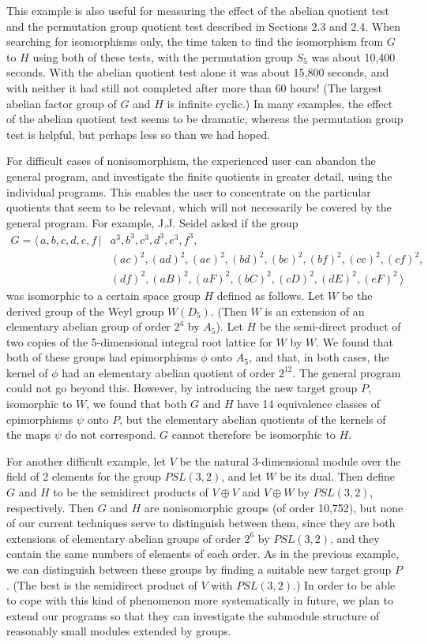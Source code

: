 This example is also useful for measuring the effect of the abelian quotient
test and the 
permutation group quotient test described in Sections 2.3 and 2.4.
When searching for isomorphisms only, the time taken to
find the isomorphism from $G$ to $H$ using both of these tests,
with the permutation group $S_5$ was about 10,400 seconds.
With the abelian quotient test alone it was about 15,800 seconds,
and with neither it had still not completed after more than 60 hours!
(The largest abelian factor group of $G$ and $H$ is infinite cyclic.)
In many examples, the effect of the abelian quotient test seems to be
dramatic, whereas the permutation group test is helpful, but perhaps less
so than we had hoped.

For difficult cases of nonisomorphism, the experienced user can abandon the
general program, and investigate the finite quotients in greater detail,
using the individual programs. This enables the user to concentrate on the
particular quotients that seem to be relevant, which will not necessarily be
covered by the general program. For example, J.J. Seidel asked if the group
\begin{eqnarray*}
G = \langle \, a,b,c,d,e,f \, | & a^3, b^3, c^3, d^3, e^3, f^3, \\
 & (ac)^2, (ad)^2, (ae)^2, (bd)^2, (be)^2, (bf)^2, (ce)^2, (cf)^2, \\
 & (df)^2, (aB)^2, (aF)^2, (bC)^2, (cD)^2, (dE)^2, (eF)^2 \, \rangle
\end{eqnarray*}
was isomorphic to a certain space group $H$ defined as follows.
Let $W$ be the derived group of the Weyl group $W(D_5)$. (Then $W$ is an
extension of an elementary abelian group of
order $2^4$ by $A_5$). Let $H$ be the semi-direct
product of two copies of the 5-dimensional integral root lattice for $W$
by $W$.  We found that both
of these groups had epimorphisms $\phi$  onto  $A_5$,  and that, in both cases,
the kernel of $\phi$ had an elementary abelian quotient of order $2^{12}$. The
general program could not go beyond this. However, by introducing the new
target group  $P$, isomorphic to $W$, we found that both $G$ and $H$ have 14
equivalence classes of epimorphisms $\psi$ onto  $P$,  but the elementary
abelian quotients of the kernels of the maps $\psi$  do not correspond. $G$
cannot therefore be isomorphic to  $H$.

For another difficult example, let  $V$  be the natural 3-dimensional module
over the field of 2 elements for the group $PSL(3,2)$, and let $W$ be its dual.
Then define $G$ and $H$ to be the semidirect products of $V \oplus V$ and
$V \oplus W$  by  $PSL(3,2)$, respectively.
Then $G$ and $H$ are nonisomorphic
groups (of order 10,752), but none of our current techniques serve to
distinguish between them, since they are both extensions of elementary
abelian groups of order $2^6$ by $PSL(3,2)$, and they contain the same
numbers of elements of each order. As in the previous example, we can
distinguish between these groups by finding a suitable new target group $P$.
(The best is the semidirect product of  $V$  with  $PSL(3,2)$.)
In order to be able to cope with this kind of phenomenon more systematically
in future, we plan to extend our programs so that they can investigate the
submodule structure of reasonably small modules extended by groups.

